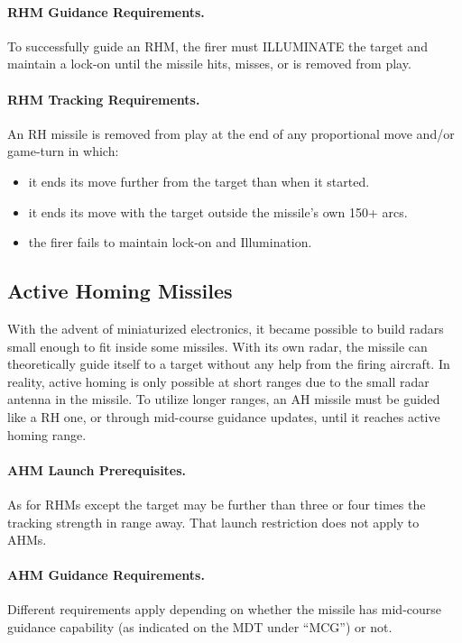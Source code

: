 \paragraph{RHM Guidance Requirements.} To successfully guide an RHM, the firer must ILLUMINATE the target and maintain a lock-on until the missile hits, misses, or is removed from play.

\paragraph{RHM Tracking Requirements.} An RH missile is removed from play at the end of any proportional move and/or game-turn in which:

\begin{itemize}

    \item it ends its move further from the target than when it started.

    \item it ends its move with the target outside the missile's own 150+ arcs.

    \item the firer fails to maintain lock-on and Illumination.

\end{itemize}

\subsection{Active Homing Missiles}

With the advent of miniaturized electronics, it became possible to build radars small enough to fit inside some missiles. With its own radar, the missile can theoretically guide itself to a target without any help from the firing aircraft. In reality, active homing is only possible at short ranges due to the small radar antenna in the missile. To utilize longer ranges, an AH missile must be guided like a RH one, or through mid-course guidance updates, until it reaches active homing range.

\paragraph{AHM Launch Prerequisites.} As for RHMs except the target may be further than three or four  times the tracking strength in range away. That launch restriction does not apply to AHMs.

\paragraph{AHM Guidance Requirements.} Different requirements apply depending on whether the missile has mid-course guidance capability (as indicated on the MDT under “MCG”) or not.

